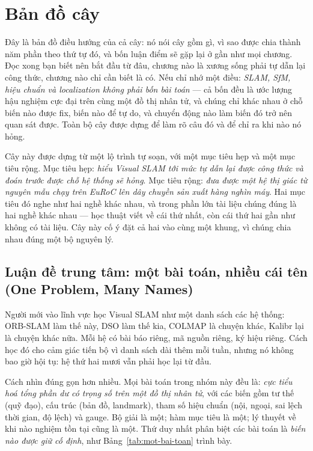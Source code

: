 \documentclass[vslam.tex]{subfiles}
\begin{document}
\chapter*{Bản đồ cây}

\begin{tomtat}
Đây là bản đồ điều hướng của cả cây: nó nói cây gồm gì, vì sao được chia thành năm phần theo thứ tự đó, và bốn luận điểm sẽ gặp lại ở gần như mọi chương. Đọc xong bạn biết nên bắt đầu từ đâu, chương nào là xương sống phải tự dẫn lại công thức, chương nào chỉ cần biết là có. Nếu chỉ nhớ một điều: \emph{SLAM, SfM, hiệu chuẩn và localization không phải bốn bài toán} --- cả bốn đều là ước lượng hậu nghiệm cực đại trên cùng một đồ thị nhân tử, và chúng chỉ khác nhau ở chỗ biến nào được fix, biến nào để tự do, và chuyển động nào làm biến đó trở nên quan sát được. Toàn bộ cây được dựng để làm rõ câu đó và để chỉ ra khi nào nó hỏng.
\end{tomtat}

Cây này được dựng từ một lộ trình tự soạn, với một mục tiêu hẹp và một mục tiêu rộng. Mục tiêu hẹp: \emph{hiểu Visual SLAM tới mức tự dẫn lại được công thức và đoán trước được chỗ hệ thống sẽ hỏng}. Mục tiêu rộng: \emph{đưa được một hệ thị giác từ nguyên mẫu chạy trên EuRoC lên dây chuyền sản xuất hàng nghìn máy}. Hai mục tiêu đó nghe như hai nghề khác nhau, và trong phần lớn tài liệu chúng đúng là hai nghề khác nhau --- học thuật viết về cái thứ nhất, còn cái thứ hai gần như không có tài liệu. Cây này cố ý đặt cả hai vào cùng một khung, vì chúng chia nhau đúng một bộ nguyên lý.

\section*{Luận đề trung tâm: một bài toán, nhiều cái tên (One Problem, Many Names)}

Người mới vào lĩnh vực học Visual SLAM như một danh sách các hệ thống: ORB-SLAM làm thế này, DSO làm thế kia, COLMAP là chuyện khác, Kalibr lại là chuyện khác nữa. Mỗi hệ có bài báo riêng, mã nguồn riêng, ký hiệu riêng. Cách học đó cho cảm giác tiến bộ vì danh sách dài thêm mỗi tuần, nhưng nó không bao giờ hội tụ: hệ thứ hai mươi vẫn phải học lại từ đầu.

Cách nhìn đúng gọn hơn nhiều. Mọi bài toán trong nhóm này đều là: \emph{cực tiểu hoá tổng phần dư có trọng số trên một đồ thị nhân tử}, với các biến gồm tư thế (quỹ đạo), cấu trúc (bản đồ, landmark), tham số hiệu chuẩn (nội, ngoại, sai lệch thời gian, độ lệch) và gauge. Bộ giải là một; hàm mục tiêu là một; lý thuyết về khi nào nghiệm tồn tại cũng là một. Thứ duy nhất phân biệt các bài toán là \emph{biến nào được giữ cố định}, như Bảng~\ref{tab:mot-bai-toan} trình bày.
\end{document}
